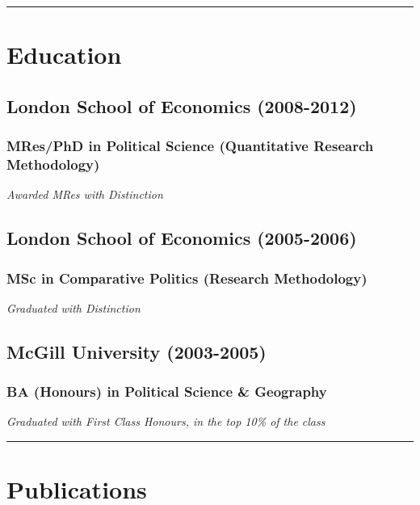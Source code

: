 \documentclass[a4paper]{article}
\begin{document}
\vspace{0.25cm}
\medskip\hrule height 1pt
\vspace{0.5cm}

\section*{Education}

\subsection*{London School of Economics (2008-2012)}
\subsubsection*{MRes/PhD in Political Science (Quantitative Research Methodology)}

\emph{Awarded MRes with Distinction}

\subsection*{London School of Economics (2005-2006)}
\subsubsection*{MSc in Comparative Politics (Research Methodology)}

\emph{Graduated with Distinction}

\subsection*{McGill University (2003-2005)}
\subsubsection*{BA (Honours) in Political Science \& Geography}

\emph{Graduated with First Class Honours, in the top 10\% of the class}

\vspace{0.25cm}
\medskip\hrule height 1pt
\vspace{0.5cm}


\section*{Publications}
\end{document}
